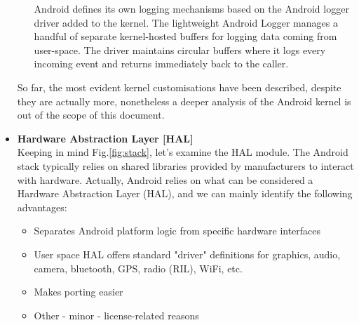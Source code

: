 \begin{itemize}
\begin{itemize}
	Android defines its own logging mechanisms based on the Android logger driver added to the kernel. The lightweight Android Logger manages a handful of separate kernel-hosted buffers for logging data coming from user-space. The driver maintains circular buffers where it logs every incoming event and returns immediately back to the caller.
	\end{itemize}
So far, the most evident kernel customisations have been described, despite they are actually more, nonetheless a deeper analysis of the Android kernel is out of the scope of this document.
\item \textbf{Hardware Abstraction Layer [HAL]}\\
Keeping in mind Fig.\ref{fig:stack}, let's examine the HAL module. The Android stack typically relies on shared libraries provided by manufacturers to interact with hardware. Actually, Android relies on what can be considered a Hardware Abstraction Layer (HAL), and we can mainly identify the following advantages:
	\begin{itemize}
		\item Separates Android platform logic from specific hardware interfaces
		\item User space HAL offers standard "driver" definitions for graphics, audio, camera, bluetooth, GPS, radio (RIL), WiFi, etc.
		\item Makes porting easier
		\item Other - minor - license-related reasons
	\end{itemize}
\begin{figure}[!htb]
	\centering

\end{figure}
\end{itemize}
